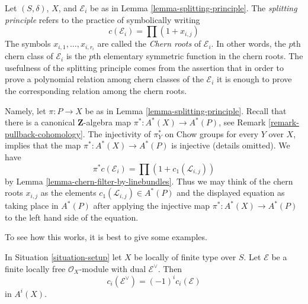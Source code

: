 \noindent
Let $(S, \delta)$, $X$, and $\mathcal{E}_i$ be as in
Lemma \ref{lemma-splitting-principle}.
The {\it splitting principle} refers to the practice of symbolically writing
$$
c(\mathcal{E}_i) = \prod (1 + x_{i, j})
$$
The symbols $x_{i, 1}, \ldots, x_{i, r_i}$ are called the {\it Chern roots}
of $\mathcal{E}_i$. In other words, the $p$th chern class of $\mathcal{E}_i$
is the $p$th elementary symmetric function in the chern roots.
The usefulness of the splitting principle comes from the assertion that
in order to prove a polynomial relation among chern classes of the
$\mathcal{E}_i$ it is enough to prove the corresponding relation among the
chern roots.

\medskip\noindent
Namely, let $\pi : P \to X$ be as in Lemma \ref{lemma-splitting-principle}.
Recall that there is a canonical $\mathbf{Z}$-algebra map
$\pi^* : A^*(X) \to A^*(P)$, see
Remark \ref{remark-pullback-cohomology}. The injectivity of $\pi_Y^*$
on Chow groups for every $Y$ over $X$, implies that the map
$\pi^* : A^*(X) \to A^*(P)$ is injective (details omitted).
We have
$$
\pi^*c(\mathcal{E}_i) = \prod (1 + c_1(\mathcal{L}_{i, j}))
$$
by Lemma \ref{lemma-chern-filter-by-linebundles}. Thus we may think of the
chern roots $x_{i, j}$ as the elements $c_1(\mathcal{L}_{i, j}) \in A^*(P)$
and the displayed equation as taking place in $A^*(P)$ after
applying the injective map $\pi^* : A^*(X) \to A^*(P)$ to the left
hand side of the equation.

\medskip\noindent
To see how this works, it is best to give some examples.

\begin{lemma}
\label{lemma-chern-classes-dual}
In Situation \ref{situation-setup} let $X$ be locally of finite type over $S$.
Let $\mathcal{E}$ be a finite locally free $\mathcal{O}_X$-module
with dual $\mathcal{E}^\vee$. Then
$$
c_i(\mathcal{E}^\vee) = (-1)^i c_i(\mathcal{E})
$$
in $A^i(X)$.
\end{lemma}

